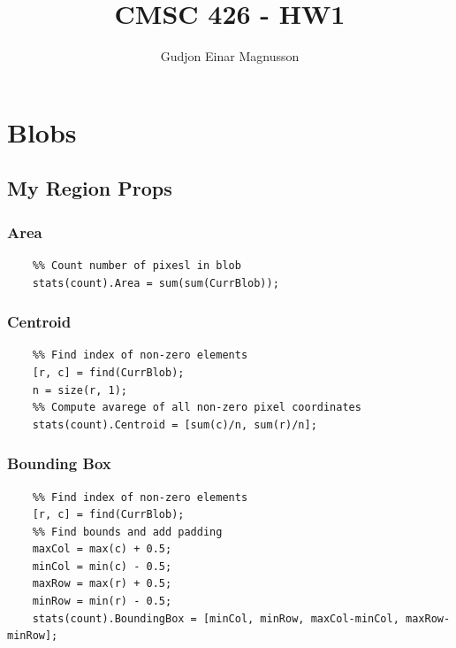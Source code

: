 \documentclass[12pt]{article}
\begin{document}
\title{CMSC 426 - HW1}
\author{Gudjon Einar Magnusson}

\maketitle

\section{Blobs}

\subsection{My Region Props}

\subsubsection{Area}
\begin{minipage}{\linewidth}
\begin{lstlisting}
    %% Count number of pixesl in blob
    stats(count).Area = sum(sum(CurrBlob));
\end{lstlisting}
\end{minipage}

\subsubsection{Centroid}
\begin{minipage}{\linewidth}
\begin{lstlisting}
    %% Find index of non-zero elements
    [r, c] = find(CurrBlob);
    n = size(r, 1);
    %% Compute avarege of all non-zero pixel coordinates
    stats(count).Centroid = [sum(c)/n, sum(r)/n];
\end{lstlisting}
\end{minipage}

\subsubsection{Bounding Box}
\begin{minipage}{\linewidth}
\begin{lstlisting}
    %% Find index of non-zero elements
    [r, c] = find(CurrBlob);
    %% Find bounds and add padding
    maxCol = max(c) + 0.5;
    minCol = min(c) - 0.5;
    maxRow = max(r) + 0.5;
    minRow = min(r) - 0.5;
    stats(count).BoundingBox = [minCol, minRow, maxCol-minCol, maxRow-minRow];
\end{lstlisting}
\end{minipage}
\end{document}
